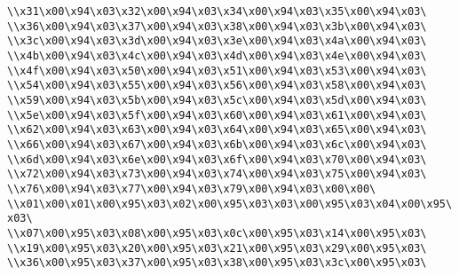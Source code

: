 \verb|\\x31\x00\x94\x03\x32\x00\x94\x03\x34\x00\x94\x03\x35\x00\x94\x03\|\newline
\verb|\\x36\x00\x94\x03\x37\x00\x94\x03\x38\x00\x94\x03\x3b\x00\x94\x03\|\newline
\verb|\\x3c\x00\x94\x03\x3d\x00\x94\x03\x3e\x00\x94\x03\x4a\x00\x94\x03\|\newline
\verb|\\x4b\x00\x94\x03\x4c\x00\x94\x03\x4d\x00\x94\x03\x4e\x00\x94\x03\|\newline
\verb|\\x4f\x00\x94\x03\x50\x00\x94\x03\x51\x00\x94\x03\x53\x00\x94\x03\|\newline
\verb|\\x54\x00\x94\x03\x55\x00\x94\x03\x56\x00\x94\x03\x58\x00\x94\x03\|\newline
\verb|\\x59\x00\x94\x03\x5b\x00\x94\x03\x5c\x00\x94\x03\x5d\x00\x94\x03\|\newline
\verb|\\x5e\x00\x94\x03\x5f\x00\x94\x03\x60\x00\x94\x03\x61\x00\x94\x03\|\newline
\verb|\\x62\x00\x94\x03\x63\x00\x94\x03\x64\x00\x94\x03\x65\x00\x94\x03\|\newline
\verb|\\x66\x00\x94\x03\x67\x00\x94\x03\x6b\x00\x94\x03\x6c\x00\x94\x03\|\newline
\verb|\\x6d\x00\x94\x03\x6e\x00\x94\x03\x6f\x00\x94\x03\x70\x00\x94\x03\|\newline
\verb|\\x72\x00\x94\x03\x73\x00\x94\x03\x74\x00\x94\x03\x75\x00\x94\x03\|\newline
\verb|\\x76\x00\x94\x03\x77\x00\x94\x03\x79\x00\x94\x03\x00\x00\|\newline
\verb|\\x01\x00\x01\x00\x95\x03\x02\x00\x95\x03\x03\x00\x95\x03\x04\x00\x95\x03\|\newline
\verb|\\x07\x00\x95\x03\x08\x00\x95\x03\x0c\x00\x95\x03\x14\x00\x95\x03\|\newline
\verb|\\x19\x00\x95\x03\x20\x00\x95\x03\x21\x00\x95\x03\x29\x00\x95\x03\|\newline
\verb|\\x36\x00\x95\x03\x37\x00\x95\x03\x38\x00\x95\x03\x3c\x00\x95\x03\|\newline
